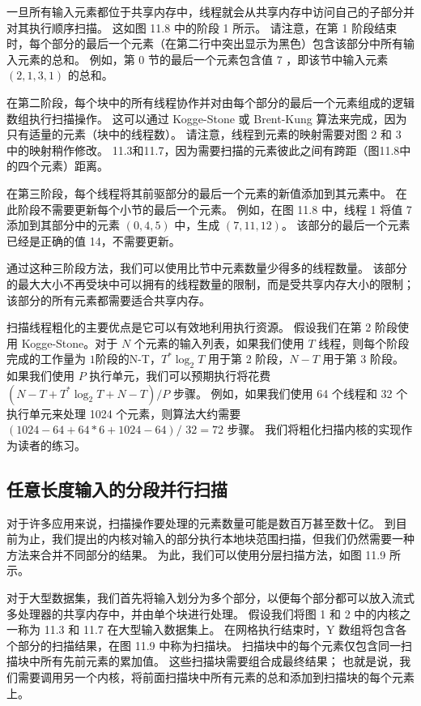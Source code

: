 一旦所有输入元素都位于共享内存中，线程就会从共享内存中访问自己的子部分并对其执行顺序扫描。 这如图 11.8 中的阶段 1 所示。 请注意，在第 1 阶段结束时，每个部分的最后一个元素（在第二行中突出显示为黑色）包含该部分中所有输入元素的总和。 例如，第 0 节的最后一个元素包含值 7 ，即该节中输入元素 $(2,1,3,1)$ 的总和。

在第二阶段，每个块中的所有线程协作并对由每个部分的最后一个元素组成的逻辑数组执行扫描操作。 这可以通过 Kogge-Stone 或 Brent-Kung 算法来完成，因为只有适量的元素（块中的线程数）。 请注意，线程到元素的映射需要对图 2 和 3 中的映射稍作修改。 11.3和11.7，因为需要扫描的元素彼此之间有跨距（图11.8中的四个元素）距离。

在第三阶段，每个线程将其前驱部分的最后一个元素的新值添加到其元素中。 在此阶段不需要更新每个小节的最后一个元素。 例如，在图 11.8 中，线程 1 将值 7 添加到其部分中的元素 $(0,4,5)$ 中，生成 $(7,11,12)$。 该部分的最后一个元素已经是正确的值 14，不需要更新。

通过这种三阶段方法，我们可以使用比节中元素数量少得多的线程数量。 该部分的最大大小不再受块中可以拥有的线程数量的限制，而是受共享内存大小的限制； 该部分的所有元素都需要适合共享内存。

扫描线程粗化的主要优点是它可以有效地利用执行资源。 假设我们在第 2 阶段使用 Kogge-Stone。对于 $N$ 个元素的输入列表，如果我们使用 $T$ 线程，则每个阶段完成的工作量为 $1 阶段的 $N-T$，T^{*} \log _{2} T$ 用于第 2 阶段，$N-T$ 用于第 3 阶段。 如果我们使用 $P$ 执行单元，我们可以预期执行将花费 $\left(N-T+T^{*} \log _{2} T+N-T\right) / P$ 步骤。 例如，如果我们使用 64 个线程和 32 个执行单元来处理 1024 个元素，则算法大约需要 $(1024-64+64 * 6+1024-64) /$ $32=72$ 步骤。 我们将粗化扫描内核的实现作为读者的练习。

\subsection{任意长度输入的分段并行扫描}
对于许多应用来说，扫描操作要处理的元素数量可能是数百万甚至数十亿。 到目前为止，我们提出的内核对输入的部分执行本地块范围扫描，但我们仍然需要一种方法来合并不同部分的结果。 为此，我们可以使用分层扫描方法，如图 11.9 所示。

对于大型数据集，我们首先将输入划分为多个部分，以便每个部分都可以放入流式多处理器的共享内存中，并由单个块进行处理。 假设我们将图 1 和 2 中的内核之一称为 11.3 和 11.7 在大型输入数据集上。 在网格执行结束时，$\mathrm{Y}$ 数组将包含各个部分的扫描结果，在图 11.9 中称为扫描块。 扫描块中的每个元素仅包含同一扫描块中所有先前元素的累加值。 这些扫描块需要组合成最终结果； 也就是说，我们需要调用另一个内核，将前面扫描块中所有元素的总和添加到扫描块的每个元素上。

